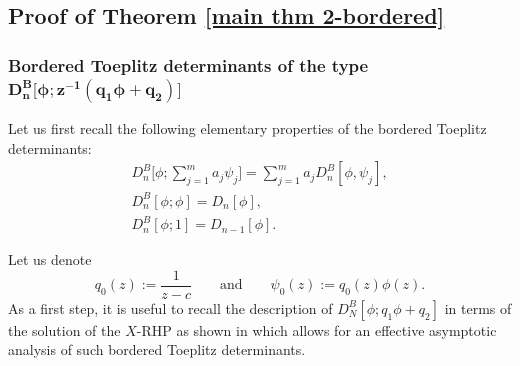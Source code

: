 \documentclass[10pt,a4paper]{amsart}
\numberwithin{equation}{section}
\newcommand{\qandq}{\qquad \text{and} \qquad}
\begin{document}
	\subsection{Proof of Theorem \ref{main thm 2-bordered}}\label{Sec 2.2}
	\subsubsection[Bordered Toeplitz determinants of the type \protect{$D^B_{n}\big[\phi;z^{-1}(q_1\phi+q_2)\big]$}]{Bordered Toeplitz determinants of the type $\boldsymbol{ D^B_{n}\big[\phi;z^{-1}(q_1\phi+q_2)\big]}$}
	Let us first recall the following elementary properties of the bordered Toeplitz determinants:
	\begin{gather}
		D^B_n\Bigg[\phi; \sum^m_{j=1} a_j \psi_j\Bigg] =\sum^m_{j=1} a_j D^B_n[\phi,\psi_j],\label{linear-combination}
\\
		D^B_{n}[\phi; \phi] = D_{n}[\phi],\label{border,phi,phi}
\\
		D^B_{n}[\phi;1] = D_{n-1}[\phi].\label{border,phi,const}
	\end{gather}
	
	
	Let us denote \begin{equation}\label{q0}
		q_0(z):= \frac{1}{z-c} \qandq \psi_0(z):=q_0(z)\phi(z).\end{equation}
	As a first step, it is useful to recall the description of $D^B_{N}[\phi;q_1\phi+q_2]$ in terms of the solution of the $X$-RHP as shown in \cite{BEGIL} which allows for an effective asymptotic analysis of such bordered Toeplitz determinants.
	
\end{document}
